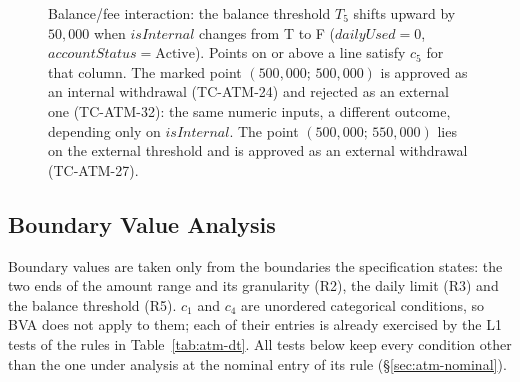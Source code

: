 \documentclass[11pt,a4paper]{article}
\begin{document}
\begin{figure}[H]
\centering
{}
\caption{Balance/fee interaction: the balance threshold \(T_5\) shifts upward
by \(50{,}000\) when \(\mathit{isInternal}\) changes from T to F
(\(\mathit{dailyUsed}=0\), \(\mathit{accountStatus}=\mathrm{Active}\)). Points
on or above a line satisfy \(c_5\) for that column. The marked point
\((500{,}000;\,500{,}000)\) is approved as an internal withdrawal
(TC-ATM-24) and rejected as an external one (TC-ATM-32): the same numeric
inputs, a different outcome, depending only on \(\mathit{isInternal}\). The point \((500{,}000;\,550{,}000)\) lies on the external threshold and is approved as an external withdrawal (TC-ATM-27).}
\label{fig:atm-fee-plane}
\end{figure}

\subsection{Boundary Value Analysis}
\label{sec:atm-bva}

Boundary values are taken only from the boundaries the specification states:
the two ends of the amount range and its granularity (R2), the daily limit
(R3) and the balance threshold (R5). \(c_1\) and \(c_4\) are unordered
categorical conditions, so BVA does not apply to them; each of their entries
is already exercised by the L1 tests of the rules in
Table~\ref{tab:atm-dt}. All tests below keep every condition other than the
one under analysis at the nominal entry of its rule (\S\ref{sec:atm-nominal}).
\end{document}
